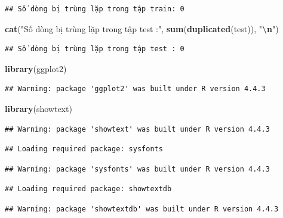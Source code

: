 \documentclass[
]{article}
\newenvironment{Shaded}{\begin{snugshade}}{\end{snugshade}}
\newcommand{\FunctionTok}[1]{\textcolor[rgb]{0.13,0.29,0.53}{\textbf{#1}}}
\newcommand{\NormalTok}[1]{#1}
\newcommand{\SpecialCharTok}[1]{\textcolor[rgb]{0.81,0.36,0.00}{\textbf{#1}}}
\newcommand{\StringTok}[1]{\textcolor[rgb]{0.31,0.60,0.02}{#1}}
\begin{document}
\begin{verbatim}
## Số dòng bị trùng lặp trong tập train: 0
\end{verbatim}

\begin{Shaded}
\begin{Highlighting}[]
\FunctionTok{cat}\NormalTok{(}\StringTok{"Số dòng bị trùng lặp trong tập test :"}\NormalTok{, }\FunctionTok{sum}\NormalTok{(}\FunctionTok{duplicated}\NormalTok{(test)), }\StringTok{"}\SpecialCharTok{\textbackslash{}n}\StringTok{"}\NormalTok{)}
\end{Highlighting}
\end{Shaded}

\begin{verbatim}
## Số dòng bị trùng lặp trong tập test : 0
\end{verbatim}

\begin{Shaded}
\begin{Highlighting}[]
\FunctionTok{library}\NormalTok{(ggplot2)}
\end{Highlighting}
\end{Shaded}

\begin{verbatim}
## Warning: package 'ggplot2' was built under R version 4.4.3
\end{verbatim}

\begin{Shaded}
\begin{Highlighting}[]
\FunctionTok{library}\NormalTok{(showtext)}
\end{Highlighting}
\end{Shaded}

\begin{verbatim}
## Warning: package 'showtext' was built under R version 4.4.3
\end{verbatim}

\begin{verbatim}
## Loading required package: sysfonts
\end{verbatim}

\begin{verbatim}
## Warning: package 'sysfonts' was built under R version 4.4.3
\end{verbatim}

\begin{verbatim}
## Loading required package: showtextdb
\end{verbatim}

\begin{verbatim}
## Warning: package 'showtextdb' was built under R version 4.4.3
\end{verbatim}
\end{document}
